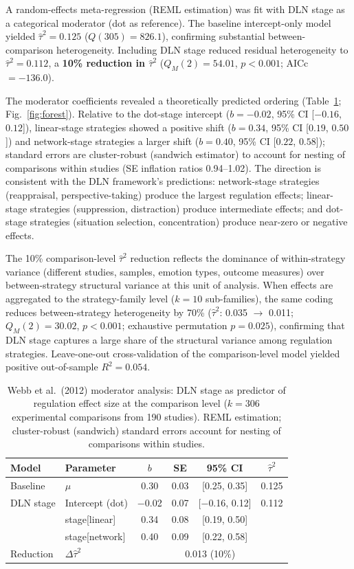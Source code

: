 \documentclass[11pt]{article}
\begin{document}
A random-effects meta-regression (REML estimation) was fit with DLN
stage as a categorical moderator (dot as reference). The baseline
intercept-only model yielded $\hat\tau^2 = 0.125$
($Q(305) = 826.1$), confirming substantial between-comparison
heterogeneity. Including DLN stage reduced residual heterogeneity to
$\hat\tau^2 = 0.112$, a \textbf{10\% reduction in $\hat\tau^2$}
($Q_M(2) = 54.01$, $p < 0.001$; AICc $= -136.0$).

The moderator coefficients revealed a theoretically predicted ordering
(Table~\ref{tab:webb_mod}; Fig.~\ref{fig:forest}). Relative to the
dot-stage intercept ($b = -0.02$, 95\% CI [$-0.16$, $0.12$]),
linear-stage strategies showed a positive shift ($b = 0.34$, 95\% CI
[$0.19$, $0.50$]) and network-stage strategies a larger shift
($b = 0.40$, 95\% CI [$0.22$, $0.58$]); standard errors are
cluster-robust (sandwich estimator) to account for nesting of
comparisons within studies (SE inflation ratios 0.94--1.02). The
direction is consistent with the DLN framework's predictions:
network-stage strategies (reappraisal, perspective-taking) produce the
largest regulation effects; linear-stage strategies (suppression,
distraction) produce intermediate effects; and dot-stage strategies
(situation selection, concentration) produce near-zero or negative
effects.

The 10\% comparison-level $\hat\tau^2$ reduction reflects the dominance
of within-strategy variance (different studies, samples, emotion types,
outcome measures) over between-strategy structural variance at this unit
of analysis. When effects are aggregated to the strategy-family level
($k = 10$ sub-families), the same coding reduces between-strategy
heterogeneity by 70\% ($\hat\tau^2$: 0.035 $\to$ 0.011;
$Q_M(2) = 30.02$, $p < 0.001$; exhaustive permutation $p = 0.025$),
confirming that DLN stage captures a large share of the structural
variance among regulation strategies. Leave-one-out cross-validation
of the comparison-level model yielded positive out-of-sample
$R^2 = 0.054$.


\begin{table}[ht]
\centering
\small
\caption{Webb et al.\ (2012) moderator analysis: DLN stage as predictor
of regulation effect size at the comparison level ($k = 306$
experimental comparisons from 190 studies). REML estimation;
cluster-robust (sandwich) standard errors account for nesting of
comparisons within studies.}\label{tab:webb_mod}
\begin{tabular}{llcccc}
\toprule
Model & Parameter & $b$ & SE & 95\% CI & $\hat\tau^2$ \\
\midrule
Baseline & $\mu$ & 0.30 & 0.03 & [0.25, 0.35] & 0.125 \\
\midrule
DLN stage & Intercept (dot) & $-$0.02 & 0.07 & [$-$0.16, 0.12] & 0.112 \\
 & stage[linear] & 0.34 & 0.08 & [0.19, 0.50] & \\
 & stage[network] & 0.40 & 0.09 & [0.22, 0.58] & \\
\midrule
Reduction & $\Delta\hat\tau^2$ & \multicolumn{4}{c}{0.013 (10\%)} \\
\bottomrule
\end{tabular}
\end{table}
\end{document}

